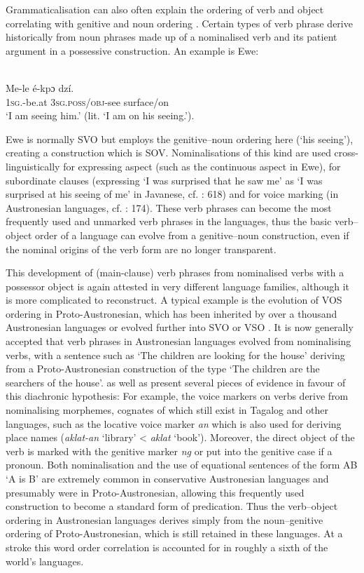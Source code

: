 \documentclass[output=paper]{langsci/langscibook}
\begin{document}
Grammaticalisation can also often explain the ordering of verb and object correlating with genitive and noun ordering \citep{Dryer2011}. Certain types of verb phrase derive historically from noun phrases made up of a nominalised verb and its patient argument in a possessive construction. An example is Ewe:

\ea

\\
\gll Me-le       é-kpɔ     dzí.\\
     \textsc{1sg}.-be.at  3\textsc{sg.poss/obj-}see   surface/on\\
\glt ‘I am seeing him.’ (lit. ‘I am on his seeing.’).
\z

Ewe is normally SVO but employs the genitive–noun ordering here (‘his seeing’), creating a construction which is SOV. Nominalisations of this kind are used cross-linguistically for expressing aspect (such as the continuous aspect in Ewe), for subordinate clauses (expressing ‘I was surprised that he saw me’ as ‘I was surprised at his seeing of me’ in Javanese, cf. \citealt{Ogloblin2005}: 618) and for voice marking (in Austronesian languages, cf. \citealt{Himmelmann2005}: 174). These verb phrases can become the most frequently used and unmarked verb phrases in the languages, thus the basic verb–object order of a language can evolve from a genitive–noun construction, even if the nominal origins of the verb form are no longer transparent. 

This development of (main-clause) verb phrases from nominalised verbs with a possessor object is again attested in very different language families, although it is more complicated to reconstruct. A typical example is the evolution of VOS ordering in Proto-Austronesian, which has been inherited by over a thousand Austronesian languages or evolved further into SVO or VSO \citep[7]{Adelaar2005}. It is now generally accepted that verb phrases in Austronesian languages evolved from nominalising verbs, with a sentence such as ‘The children are looking for the house’ deriving from a Proto-Austronesian construction of the type ‘The children are the searchers of the house’. \citet{StarostaEtAl1982} as well as \citet{Kaufman2009} present several pieces of evidence in favour of this diachronic hypothesis: For example, the voice markers on verbs derive from nominalising morphemes, cognates of which still exist in Tagalog and other languages, such as the locative voice marker \textit{an} which is also used for deriving place names (\textit{aklat-an} ‘library’ < \textit{aklat} ‘book’). Moreover, the direct object of the verb is marked with the genitive marker \textit{ng} or put into the genitive case if a pronoun. Both nominalisation and the use of equational sentences of the form AB ‘A is B’ are extremely common in conservative Austronesian languages and presumably were in Proto-Austronesian, allowing this frequently used construction to become a standard form of predication. Thus the verb–object ordering in Austronesian languages derives simply from the noun–genitive ordering of Proto-Austronesian, which is still retained in these languages. At a stroke this word order correlation is accounted for in roughly a sixth of the world’s languages.
\end{document}
